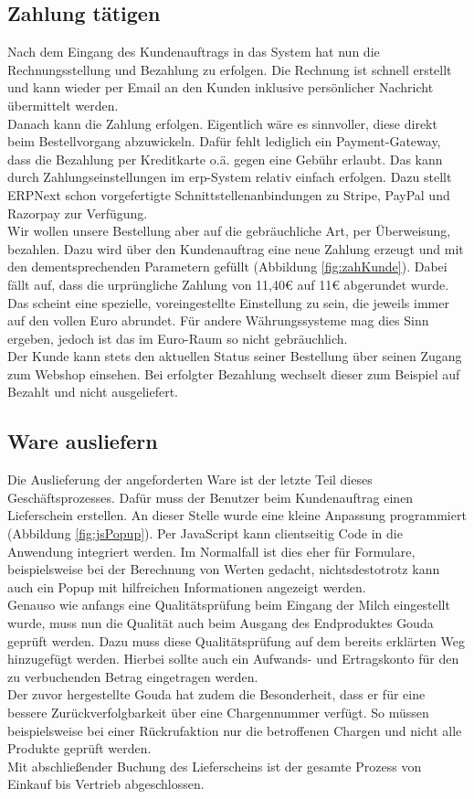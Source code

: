 \subsection{Zahlung tätigen}
Nach dem Eingang des Kundenauftrags in das System hat nun die Rechnungsstellung und Bezahlung zu erfolgen. Die Rechnung ist schnell erstellt und kann wieder per Email an den Kunden inklusive persönlicher Nachricht übermittelt werden. \\
Danach kann die Zahlung erfolgen. Eigentlich wäre es sinnvoller, diese direkt beim Bestellvorgang abzuwickeln. Dafür fehlt lediglich ein Payment-Gateway, dass die Bezahlung per Kreditkarte o.ä. gegen eine Gebühr erlaubt. Das kann durch Zahlungseinstellungen im \gls{erp}-System relativ einfach erfolgen. Dazu stellt ERPNext schon vorgefertigte Schnittstellenanbindungen zu Stripe, PayPal und Razorpay zur Verfügung. \\
Wir wollen unsere Bestellung aber auf die gebräuchliche Art, per Überweisung, bezahlen. Dazu wird über den Kundenauftrag eine neue Zahlung erzeugt und mit den dementsprechenden Parametern gefüllt (\vgl Abbildung \ref{fig:zahKunde}). Dabei fällt auf, dass die urprüngliche Zahlung von 11,40€ auf 11€ abgerundet wurde. Das scheint eine spezielle, voreingestellte Einstellung zu sein, die jeweils immer auf den vollen Euro abrundet. Für andere Währungssysteme mag dies Sinn ergeben, jedoch ist das im Euro-Raum so nicht gebräuchlich. \\
Der Kunde kann stets den aktuellen Status seiner Bestellung über seinen Zugang zum Webshop einsehen. Bei erfolgter Bezahlung wechselt dieser zum Beispiel auf \glqq Bezahlt und nicht ausgeliefert\grqq. 

\subsection{Ware ausliefern}
Die Auslieferung der angeforderten Ware ist der letzte Teil dieses Geschäftsprozesses. Dafür muss der Benutzer beim Kundenauftrag einen Lieferschein erstellen. An dieser Stelle wurde eine kleine Anpassung programmiert (\vgl Abbildung \ref{fig:jsPopup}). Per JavaScript kann clientseitig Code in die Anwendung integriert werden. Im Normalfall ist dies eher für Formulare, beispielsweise bei der Berechnung von Werten gedacht, nichtsdestotrotz kann auch ein Popup mit hilfreichen Informationen angezeigt werden. \\
Genauso wie anfangs eine Qualitätsprüfung beim Eingang der Milch eingestellt wurde, muss nun die Qualität auch beim Ausgang des Endproduktes Gouda geprüft werden. Dazu muss diese Qualitätsprüfung auf dem bereits erklärten Weg hinzugefügt werden. Hierbei sollte auch ein Aufwands- und Ertragskonto für den zu verbuchenden Betrag eingetragen werden. \\
Der zuvor hergestellte Gouda hat zudem die Besonderheit, dass er für eine bessere Zurückverfolgbarkeit über eine Chargennummer verfügt. So müssen beispielsweise bei einer Rückrufaktion nur die betroffenen Chargen und nicht alle Produkte geprüft werden. \\
Mit abschließender Buchung des Lieferscheins ist der gesamte Prozess von Einkauf bis Vertrieb abgeschlossen.

